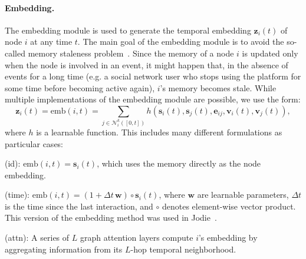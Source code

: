 \documentclass{article}
\begin{document}

\paragraph*{Embedding.}
 

The embedding module is used to generate the temporal embedding $\mathbf{z}_i(t)$ of node $i$ at any time $t$. 
The main goal of the embedding module is to avoid the so-called memory staleness problem~\citep{dynamic-graphs-survey}. Since the memory of a node $i$ is updated only when the node is involved in an event, it might happen that, in the absence of events for a long time (e.g. a social network user who stops using the platform for some time before becoming active again), $i$'s memory becomes stale.
While multiple implementations of the embedding module are possible, we use the form:  
%
\begin{equation} 
    \mathbf{z}_i(t) = \mathrm{emb}(i, t) = \sum_{j \in \mathcal{N}^k_i([0, t]) } h\left(\mathbf{s}_i(t), \mathbf{s}_j(t), \mathbf{e}_{ij}, \mathbf{v}_i(t), \mathbf{v}_j(t)\right), \nonumber
\end{equation}
%
where $h$ is a learnable function. %
This includes many different formulations as particular cases: 

 (id): $\mathrm{emb}(i, t) = \mathbf{s}_i(t)$, which uses the memory directly as the node embedding. 


 (time): $\mathrm{emb}(i, t) = (1 + \Delta t \, \mathbf{w}) \circ \mathbf{s}_i(t)$, where $\mathbf{w}$ are learnable parameters, $\Delta t$ is the time since the last interaction, and $\circ$ denotes element-wise vector product. This version of the embedding method was used in Jodie~\citep{10.1145/3292500.3330895}.  

 (attn): A series of $L$ graph attention layers compute $i$'s embedding by aggregating information from its $L$-hop temporal neighborhood.
\end{document}
